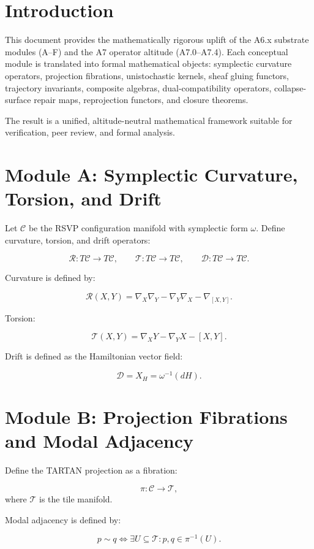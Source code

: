 \section{Introduction}

This document provides the mathematically rigorous uplift of the A6.x substrate
modules (A–F) and the A7 operator altitude (A7.0–A7.4). Each conceptual module
is translated into formal mathematical objects: symplectic curvature operators,
projection fibrations, unistochastic kernels, sheaf gluing functors, trajectory
invariants, composite algebras, dual-compatibility operators, collapse-surface
repair maps, reprojection functors, and closure theorems.

The result is a unified, altitude-neutral mathematical framework suitable for
verification, peer review, and formal analysis.

\section{Module A: Symplectic Curvature, Torsion, and Drift}

Let $\mathcal{C}$ be the RSVP configuration manifold with symplectic form
$\omega$. Define curvature, torsion, and drift operators:

\[
\mathcal{R} : T\mathcal{C} \to T\mathcal{C}, \qquad
\mathcal{T} : T\mathcal{C} \to T\mathcal{C}, \qquad
\mathcal{D} : T\mathcal{C} \to T\mathcal{C}.
\]

Curvature is defined by:

\[
\mathcal{R}(X,Y) = \nabla_X \nabla_Y - \nabla_Y \nabla_X - \nabla_{[X,Y]}.
\]

Torsion:

\[
\mathcal{T}(X,Y) = \nabla_X Y - \nabla_Y X - [X,Y].
\]

Drift is defined as the Hamiltonian vector field:

\[
\mathcal{D} = X_H = \omega^{-1}(dH).
\]

\section{Module B: Projection Fibrations and Modal Adjacency}

Define the TARTAN projection as a fibration:

\[
\pi : \mathcal{C} \to \mathcal{T},
\]
where $\mathcal{T}$ is the tile manifold.

Modal adjacency is defined by:

\[
p \sim q \iff \exists U \subseteq \mathcal{T} : p,q \in \pi^{-1}(U).
\]

